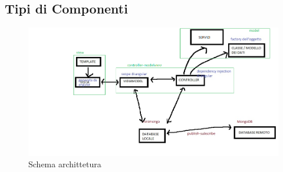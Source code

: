 \subsection{Tipi di Componenti}

\begin{figure}[H]
\begin{center}
\includegraphics[scale=0.50]{img/architettura.png}
\caption{Schema archittetura}
\end{center}
\end{figure}


